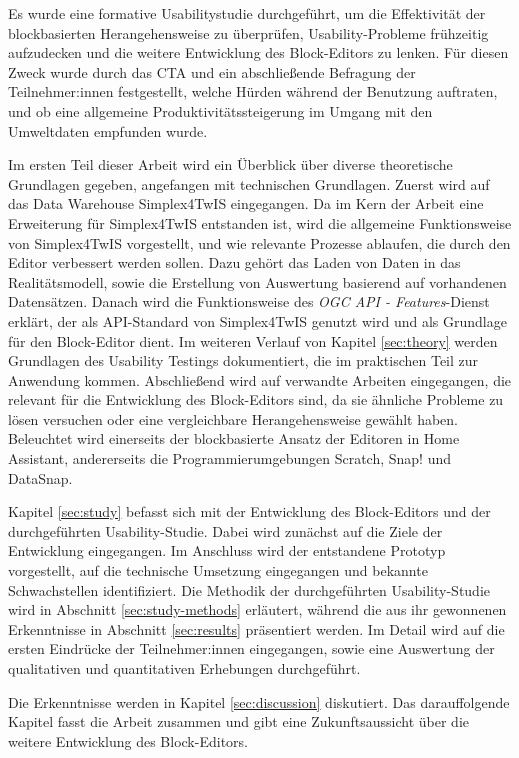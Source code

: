 Es wurde eine formative Usabilitystudie durchgeführt, um die Effektivität der blockbasierten Herangehensweise zu überprüfen, Usability-Probleme frühzeitig aufzudecken und die weitere Entwicklung des Block-Editors zu lenken. Für diesen Zweck wurde durch das \acf{CTA} und ein abschließende Befragung der Teilnehmer:innen festgestellt, welche Hürden während der Benutzung auftraten, und ob eine allgemeine Produktivitätssteigerung im Umgang mit den Umweltdaten empfunden wurde.

\pskip
Im ersten Teil dieser Arbeit wird ein Überblick über diverse theoretische Grundlagen gegeben, angefangen mit technischen Grundlagen. Zuerst wird auf das Data Warehouse Simplex4TwIS eingegangen. Da im Kern der Arbeit eine Erweiterung für Simplex4TwIS entstanden ist, wird die allgemeine Funktionsweise von Simplex4TwIS vorgestellt, und wie relevante Prozesse ablaufen, die durch den Editor verbessert werden sollen. Dazu gehört das Laden von Daten in das Realitätsmodell, sowie die Erstellung von Auswertung basierend auf vorhandenen Datensätzen. Danach wird die Funktionsweise des \textit{\acs{OGC} \acs{API} - Features}-Dienst erklärt, der als \acs{API}-Standard von Simplex4TwIS genutzt wird und als Grundlage für den Block-Editor dient. Im weiteren Verlauf von Kapitel \ref{sec:theory} werden Grundlagen des Usability Testings dokumentiert, die im praktischen Teil zur Anwendung kommen. Abschließend wird auf verwandte Arbeiten eingegangen, die relevant für die Entwicklung des Block-Editors sind, da sie ähnliche Probleme zu lösen versuchen oder eine vergleichbare Herangehensweise gewählt haben. Beleuchtet wird einerseits der blockbasierte Ansatz der Editoren in Home Assistant, andererseits die Programmierumgebungen Scratch, Snap! und DataSnap.

Kapitel \ref{sec:study} befasst sich mit der Entwicklung des Block-Editors und der durchgeführten Usability-Studie. Dabei wird zunächst auf die Ziele der Entwicklung eingegangen. Im Anschluss wird der entstandene Prototyp vorgestellt, auf die technische Umsetzung eingegangen und bekannte Schwachstellen identifiziert. Die Methodik der durchgeführten Usability-Studie wird in Abschnitt \ref{sec:study-methods} erläutert, während die aus ihr gewonnenen Erkenntnisse in Abschnitt \ref{sec:results} präsentiert werden. Im Detail wird auf die ersten Eindrücke der Teilnehmer:innen eingegangen, sowie eine Auswertung der qualitativen und quantitativen Erhebungen durchgeführt.

Die Erkenntnisse werden in Kapitel \ref{sec:discussion} diskutiert. Das darauffolgende Kapitel fasst die Arbeit zusammen und gibt eine Zukunftsaussicht über die weitere Entwicklung des Block-Editors.
